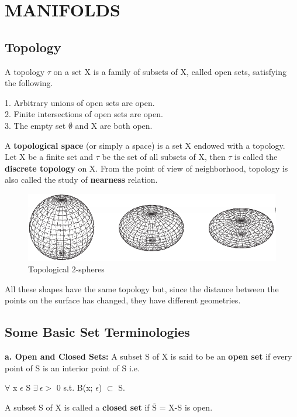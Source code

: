 \section{MANIFOLDS}
\subsection{Topology}
A topology $\tau$ on a set X is a family of subsets of X, called
open sets, satisfying the following.

1. Arbitrary unions of open sets are open. \\
2. Finite intersections of open sets are open. \\
3. The empty set $\emptyset$ and X are both open.

A \textbf{topological space} (or simply a space) is a set X endowed with a topology.
Let X be a finite set and $\tau$ be the set of all subsets of X, then $\tau$ is called the \textbf{discrete topology} on X.
From the point of view of neighborhood, topology is also called the study of \textbf{nearness} relation.
\begin{figure}[h]
    \begin{center}
        \includegraphics[width=\textwidth]{figures/topology_sphere.png}
        \caption{Topological 2-spheres}
    \end{center}
\end{figure}

All these shapes have the same topology but, since
the distance between the points on the surface has changed, they have different
geometries.

\subsection{Some Basic Set Terminologies}
\textbf{a. Open and Closed Sets:} A subset S of X is said to be an \textbf{open set} if every point of S is an interior point of S i.e.
\begin{center}
    $\forall$ x $\epsilon$ S $\exists \: \epsilon >$ 0 s.t. B(x; $\epsilon$) $\subset$ S.    
\end{center}
A subset S of X is called a \textbf{closed set} if $\overline{\text{S}}$ = X-S is open.


